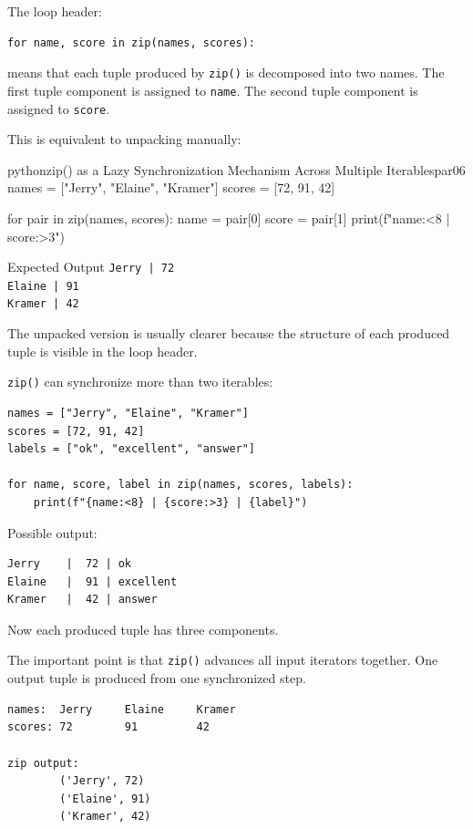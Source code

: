The loop header:

\begin{verbatim}
for name, score in zip(names, scores):
\end{verbatim}

means that each tuple produced by \texttt{zip()} is decomposed into two names. The first tuple component is assigned to \texttt{name}. The second tuple component is assigned to \texttt{score}.

This is equivalent to unpacking manually:

\begin{codebox}[]{python}{zip() as a Lazy Synchronization Mechanism Across Multiple Iterables}{par06}
names = ["Jerry", "Elaine", "Kramer"]
scores = [72, 91, 42]

for pair in zip(names, scores):
    name = pair[0]
    score = pair[1]
    print(f"{name:<8} | {score:>3}")
\end{codebox}


\begin{iobox}{Expected Output}
\texttt{Jerry    |  72} \\
\texttt{Elaine   |  91} \\
\texttt{Kramer   |  42} \\
\end{iobox}


The unpacked version is usually clearer because the structure of each produced tuple is visible in the loop header.

\texttt{zip()} can synchronize more than two iterables:

\begin{verbatim}
names = ["Jerry", "Elaine", "Kramer"]
scores = [72, 91, 42]
labels = ["ok", "excellent", "answer"]

for name, score, label in zip(names, scores, labels):
    print(f"{name:<8} | {score:>3} | {label}")
\end{verbatim}

Possible output:

\begin{verbatim}
Jerry    |  72 | ok
Elaine   |  91 | excellent
Kramer   |  42 | answer
\end{verbatim}

Now each produced tuple has three components.

The important point is that \texttt{zip()} advances all input iterators together. One output tuple is produced from one synchronized step.

\begin{verbatim}
names:  Jerry     Elaine     Kramer
scores: 72        91         42

zip output:
        ('Jerry', 72)
        ('Elaine', 91)
        ('Kramer', 42)
\end{verbatim}


